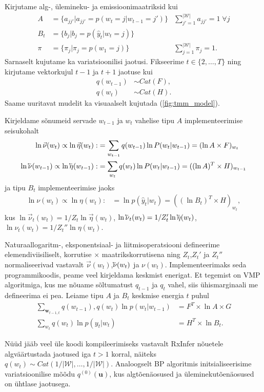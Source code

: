 Kirjutame alg-, ülemineku- ja emissioonimaatriksid kui
\begin{align*}
   A &= \{a_{jj'} | a_{jj'} = p(w_t = j | w_{t-1} = j')\} &\sum_{j'=1}^{|\mathcal{W}|} a_{jj'} = 1 \; \forall j\\
   B_t &= \{ b_j | b_j = p(\hat{y}_t | w_t = j)\}\\
    \pi &= \{ \pi_j | \pi_j = p(w_1 = j) \} &\sum_{j=1}^{|\mathcal{W}|} \pi_{j} = 1.
\end{align*}
Sarnaselt kujutame ka variatsioonilisi jaotusi. Fikseerime $t \in \{2,\ldots,T\}$ ning kirjutame vektorkujul $t-1$ ja $t+1$ jaotuse kui
\begin{align*}
    q(w_{t-1}) &\sim Cat(F),\\
    q(w_{t}) &\sim Cat(H).
\end{align*}
Saame uuritavat mudelit ka visuaalselt kujutada (\ref{fig:tmm_model}).

Kirjeldame sõnumeid servade $w_{t-1}$ ja $w_t$ vahelise tipu $A$ implementeerimise seisukohalt
\begin{align*}
    \ln \vec{\nu}(w_t) \propto \ln \vec{\eta}(w_t) :&= \sum_{w_{t-1}} q(w_{t-1}) \ln P(w_t | w_{t-1}) = (\ln A \times F)_{w_t} \\
    \ln \cev{\nu}(w_{t-1}) \propto \ln \cev{\eta}(w_{t-1}) :&= \sum_{w_{t}} q(w_{t}) \ln P(w_t | w_{t-1}) = ((\ln A)^T \times H)_{w_{t-1}}
\end{align*}
ja tipu $B_t$ implementeerimise jaoks
\begin{align*}
    \ln \nu(w_t) \propto \ln \eta(w_t) :&= \ln p(\hat{y}_t | w_t) = ((\ln B_t)^T \times H)_{w_t},
\end{align*}
kus $\ln \vec{\nu}_{t}(w_t) = 1/Z_t \ln \vec{\eta}(w_t) $, $\ln \cev{\nu}_{t}(w_t) = 1/Z_t' \ln \cev{\eta}(w_t) $, $\ln \nu_{t}(w_t) = 1/Z_t'' \ln \eta(w_t)$. 

Naturaallogaritm-, eksponentsiaal- ja liitmisoperatsiooni defineerime elemendiviisiliselt, korrutise $\times$  maatrikskorrutisena ning $Z_t$,$Z_t'$ ja $Z_t''$ normaliseerivad vastavalt $\vec{\nu}(w_t)$,$\cev{\nu}(w_t)$ ja $\nu(w_t)$. Implementeerimaks seda programmikoodis, peame veel kirjeldama keskmist enerigat. Et tegemist on VMP algoritmiga, kus me nõuame sõltumatust $q_{t-1}$ ja $q_t$ vahel, siis ühismarginaali me defineerima ei pea. Leiame tipu $A$ ja $B_t$ keskmise energia $t$ puhul
\begin{align*}
    \sum_{\bm{w}_{t-1,t}} q(w_{t-1}),q(w_t) \ln p(w_t|w_{t-1}) &= F^T \times \ln A \times G\\
    \sum_{w_t} q(w_t)\ln p(y_t|w_t) &= H^T \times \ln B_t.
\end{align*}

Nüüd jääb veel üle koodi kompileerimiseks vastavalt RxInfer nõuetele algväärtustada jaotused iga $t > 1$ korral, näiteks $q(w_t) \sim Cat(1/|\mathcal{W}|,\ldots,1/|\mathcal{W}|)$. Analoogselt BP algoritmis initsialiseerisime variatsioonilise mõõdu $q^{(0)}(\bm{u})$, kus algtõenäosused ja üleminekutõenäosused on ühtlase jaotusega.